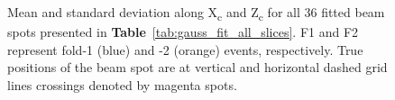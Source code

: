 \begin{figure}
\centering
{}
\caption{Mean and standard deviation along X\textsubscript{c} and Z\textsubscript{c} for all 36 fitted beam spots presented in \textbf{Table}~\ref{tab:gauss_fit_all_slices}. F1 and F2 represent fold-1 (blue) and -2 (orange) events, respectively. True positions of the beam spot are at vertical and horizontal dashed grid lines crossings denoted by magenta spots.}
\label{fig:18pts_gaussian_beam_spot}       %
\end{figure}

